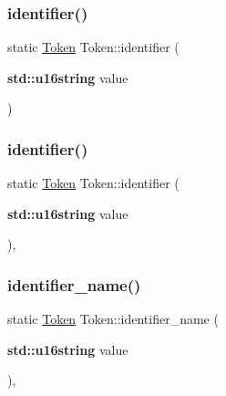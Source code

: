 \subsubsection{\texorpdfstring{identifier()}{identifier()}\hspace{0.1cm}{\footnotesize\ttfamily [2/3]}}
{\footnotesize\ttfamily static \hyperlink{class_token}{Token} Token\+::identifier (\begin{DoxyParamCaption}\item[{\textbf{ std\+::u16string}}]{value }\end{DoxyParamCaption})\hspace{0.3cm}{\ttfamily [static]}}

\mbox{\label{class_token_af8cc69259b72cb8fb6f86da202564f15}} 
\subsubsection{\texorpdfstring{identifier()}{identifier()}\hspace{0.1cm}{\footnotesize\ttfamily [3/3]}}
{\footnotesize\ttfamily static \hyperlink{class_token}{Token} Token\+::identifier (\begin{DoxyParamCaption}\item[{\textbf{ std\+::u16string}}]{value }\end{DoxyParamCaption})\hspace{0.3cm}{\ttfamily [inline]}, {\ttfamily [static]}}

\mbox{\label{class_token_ab97eb94f13e337e95b9a31a1956085ed}} 
\subsubsection{\texorpdfstring{identifier\+\_\+name()}{identifier\_name()}}
{\footnotesize\ttfamily static \hyperlink{class_token}{Token} Token\+::identifier\+\_\+name (\begin{DoxyParamCaption}\item[{\textbf{ std\+::u16string}}]{value }\end{DoxyParamCaption})\hspace{0.3cm}{\ttfamily [inline]}, {\ttfamily [static]}}

\mbox{\label{class_token_a4a628c34f5ac213787a74b19a5d862d9}} 
